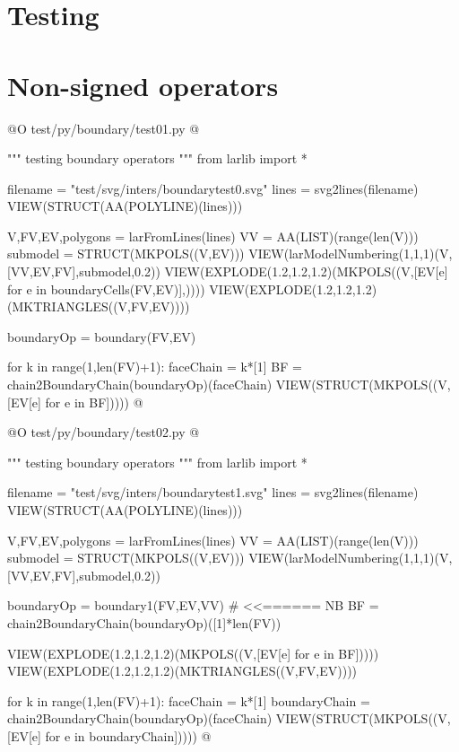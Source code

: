 \documentclass[11pt,oneside]{article}	%
\begin{document}
\section{Testing}

\section{Non-signed operators}


@O test/py/boundary/test01.py
@{""" testing boundary operators """
from larlib import *

filename = "test/svg/inters/boundarytest0.svg"
lines = svg2lines(filename)
VIEW(STRUCT(AA(POLYLINE)(lines)))
    
V,FV,EV,polygons = larFromLines(lines)
VV = AA(LIST)(range(len(V)))
submodel = STRUCT(MKPOLS((V,EV)))
VIEW(larModelNumbering(1,1,1)(V,[VV,EV,FV],submodel,0.2))
VIEW(EXPLODE(1.2,1.2,1.2)(MKPOLS((V,[EV[e] for e in boundaryCells(FV,EV)],))))
VIEW(EXPLODE(1.2,1.2,1.2)(MKTRIANGLES((V,FV,EV))))

boundaryOp = boundary(FV,EV)

for k in range(1,len(FV)+1):
    faceChain = k*[1]
    BF = chain2BoundaryChain(boundaryOp)(faceChain)
    VIEW(STRUCT(MKPOLS((V,[EV[e] for e in BF]))))
@}

@O test/py/boundary/test02.py
@{""" testing boundary operators """
from larlib import *

filename = "test/svg/inters/boundarytest1.svg"
lines = svg2lines(filename)
VIEW(STRUCT(AA(POLYLINE)(lines)))
    
V,FV,EV,polygons = larFromLines(lines)
VV = AA(LIST)(range(len(V)))
submodel = STRUCT(MKPOLS((V,EV)))
VIEW(larModelNumbering(1,1,1)(V,[VV,EV,FV],submodel,0.2))

boundaryOp = boundary1(FV,EV,VV)  # <<======  NB
BF = chain2BoundaryChain(boundaryOp)([1]*len(FV))

VIEW(EXPLODE(1.2,1.2,1.2)(MKPOLS((V,[EV[e] for e in BF]))))
VIEW(EXPLODE(1.2,1.2,1.2)(MKTRIANGLES((V,FV,EV))))

for k in range(1,len(FV)+1):
    faceChain = k*[1]
    boundaryChain = chain2BoundaryChain(boundaryOp)(faceChain)
    VIEW(STRUCT(MKPOLS((V,[EV[e] for e in boundaryChain]))))
@}
\end{document}
